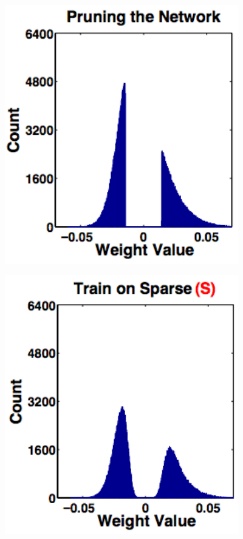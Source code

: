 {

\vfill
\centerline{\includegraphics[width = 4in]{../images/DSD2}}


\vfill
\centerline{\includegraphics[width = 4in]{../images/DSD3}}


}
